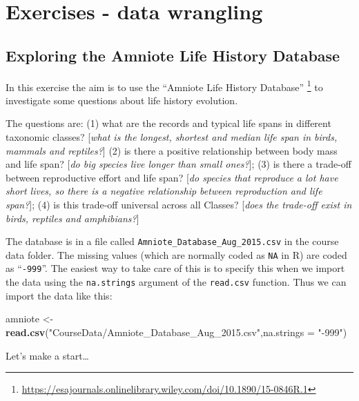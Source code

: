 \documentclass[
  a4paperpaper,
]{book}
\newenvironment{Shaded}{\begin{snugshade}}{\end{snugshade}}
\newcommand{\DataTypeTok}[1]{\textcolor[rgb]{0.13,0.29,0.53}{#1}}
\newcommand{\KeywordTok}[1]{\textcolor[rgb]{0.13,0.29,0.53}{\textbf{#1}}}
\newcommand{\NormalTok}[1]{#1}
\newcommand{\StringTok}[1]{\textcolor[rgb]{0.31,0.60,0.02}{#1}}
\begin{document}
\hypertarget{exercises---data-wrangling}{%
\section{Exercises - data wrangling}\label{exercises---data-wrangling}}

\hypertarget{exploring-the-amniote-life-history-database}{%
\subsection{Exploring the Amniote Life History Database}\label{exploring-the-amniote-life-history-database}}

In this exercise the aim is to use the ``Amniote Life History Database'' \footnote{\url{https://esajournals.onlinelibrary.wiley.com/doi/10.1890/15-0846R.1}} to investigate some questions about life history evolution.

The questions are:
(1) what are the records and typical life spans in different taxonomic classes? {[}\emph{what is the longest, shortest and median life span in birds, mammals and reptiles?}{]}
(2) is there a positive relationship between body mass and life span? {[}\emph{do big species live longer than small ones?}{]};
(3) is there a trade-off between reproductive effort and life span? {[}\emph{do species that reproduce a lot have short lives, so there is a negative relationship between reproduction and life span?}{]};
(4) is this trade-off universal across all Classes? {[}\emph{does the trade-off exist in birds, reptiles and amphibians?}{]}

The database is in a file called \texttt{Amniote\_Database\_Aug\_2015.csv} in the course data folder. The missing values (which are normally coded as \texttt{NA} in R) are coded as ``\texttt{-999}''. The easiest way to take care of this is to specify this when we import the data using the \texttt{na.strings} argument of the \texttt{read.csv} function. Thus we can import the data like this:

\begin{Shaded}
\begin{Highlighting}[]
\NormalTok{amniote \textless{}{-}}\StringTok{ }\KeywordTok{read.csv}\NormalTok{(}\StringTok{"CourseData/Amniote\_Database\_Aug\_2015.csv"}\NormalTok{,}\DataTypeTok{na.strings =} \StringTok{"{-}999"}\NormalTok{)}
\end{Highlighting}
\end{Shaded}

Let's make a start\ldots{}
\end{document}
